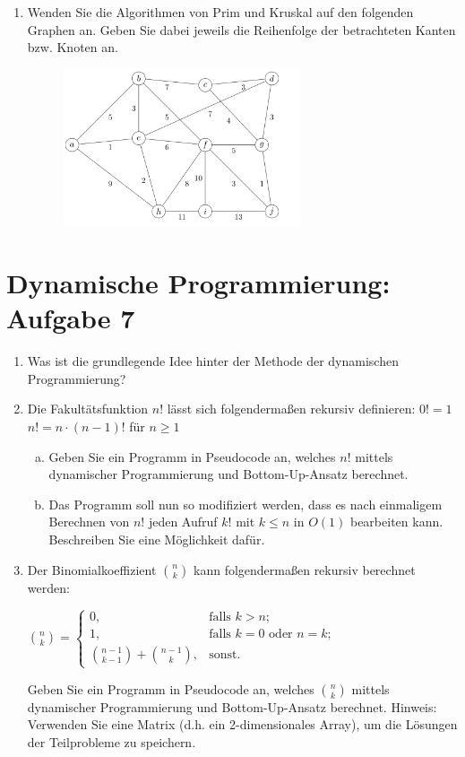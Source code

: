 \documentclass{scrartcl}
\begin{document}
\begin{enumerate}[(1)]
\item Wenden Sie die Algorithmen von Prim und Kruskal auf den folgenden Graphen an. Geben Sie dabei jeweils die Reihenfolge der betrachteten Kanten bzw. Knoten an.

\begin{figure}[h]
\centering
\includegraphics[width=0.66\textwidth]{mst_graph.png}
\end{figure}


\end{enumerate}

\section*{Dynamische Programmierung: Aufgabe 7}
\begin{enumerate}[(1)]

\item Was ist die grundlegende Idee hinter der Methode der dynamischen Programmierung?

\item Die Fakultätsfunktion $n!$ lässt sich folgendermaßen rekursiv definieren: \newline
$0! = 1$\newline
$n! = n\cdot(n-1)!$ 	für $n \geq 1$
\begin{enumerate}[(a)]
\item Geben Sie ein Programm in Pseudocode an, welches $n!$  mittels dynamischer Programmierung und Bottom-Up-Ansatz berechnet.
\item Das Programm soll nun so modifiziert werden, dass es nach einmaligem Berechnen von $n!$ jeden Aufruf $k!$ mit $k \leq n$ in $O(1)$ bearbeiten kann. Beschreiben Sie eine Möglichkeit dafür.
\end{enumerate}

\item Der Binomialkoeffizient $\binom{n}{k}$ kann folgendermaßen rekursiv berechnet werden:
\begin{center}
$\binom{n}{k}=\begin{cases}
0, & \text{falls } k > n;\\
1, & \text{falls } k=0 \text{ oder } n=k;\\
\binom{n-1}{k-1} + \binom{n-1}{k}, & \text{sonst.}
\end{cases}$
\end{center}
Geben Sie ein Programm in Pseudocode an, welches $\binom{n}{k}$ mittels dynamischer Programmierung und Bottom-Up-Ansatz berechnet. Hinweis: Verwenden Sie eine Matrix (d.h. ein 2-dimensionales Array), um die Lösungen der Teilprobleme zu speichern.

\end{enumerate}
\end{document}
